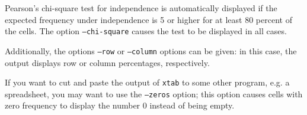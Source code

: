 Pearson's chi-square test for independence is automatically displayed
if the expected frequency under independence is 5 or higher for at
least 80 percent of the cells. The option \texttt{--chi-square} causes
the test to be displayed in all cases.

Additionally, the options \texttt{--row} or \texttt{--column} options
can be given: in this case, the output displays row or column
percentages, respectively. 

If you want to cut and paste the output of \texttt{xtab} to some other
program, e.g. a spreadsheet, you may want to use the \texttt{--zeros}
option; this option causes cells with zero frequency to display the
number 0 instead of being empty.

